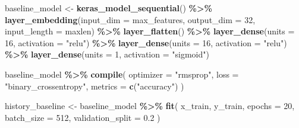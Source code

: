 \documentclass[
]{article}
\newenvironment{Shaded}{\begin{snugshade}}{\end{snugshade}}
\newcommand{\AttributeTok}[1]{\textcolor[rgb]{0.13,0.29,0.53}{#1}}
\newcommand{\DecValTok}[1]{\textcolor[rgb]{0.00,0.00,0.81}{#1}}
\newcommand{\FloatTok}[1]{\textcolor[rgb]{0.00,0.00,0.81}{#1}}
\newcommand{\FunctionTok}[1]{\textcolor[rgb]{0.13,0.29,0.53}{\textbf{#1}}}
\newcommand{\NormalTok}[1]{#1}
\newcommand{\OtherTok}[1]{\textcolor[rgb]{0.56,0.35,0.01}{#1}}
\newcommand{\SpecialCharTok}[1]{\textcolor[rgb]{0.81,0.36,0.00}{\textbf{#1}}}
\newcommand{\StringTok}[1]{\textcolor[rgb]{0.31,0.60,0.02}{#1}}
\begin{document}
\begin{Shaded}
\begin{Highlighting}[]
\NormalTok{baseline\_model }\OtherTok{\textless{}{-}} \FunctionTok{keras\_model\_sequential}\NormalTok{() }\SpecialCharTok{\%\textgreater{}\%}
  \FunctionTok{layer\_embedding}\NormalTok{(}\AttributeTok{input\_dim =}\NormalTok{ max\_features, }\AttributeTok{output\_dim =} \DecValTok{32}\NormalTok{, }\AttributeTok{input\_length =}\NormalTok{ maxlen) }\SpecialCharTok{\%\textgreater{}\%}
  \FunctionTok{layer\_flatten}\NormalTok{() }\SpecialCharTok{\%\textgreater{}\%}
  \FunctionTok{layer\_dense}\NormalTok{(}\AttributeTok{units =} \DecValTok{16}\NormalTok{, }\AttributeTok{activation =} \StringTok{"relu"}\NormalTok{) }\SpecialCharTok{\%\textgreater{}\%}
  \FunctionTok{layer\_dense}\NormalTok{(}\AttributeTok{units =} \DecValTok{16}\NormalTok{, }\AttributeTok{activation =} \StringTok{"relu"}\NormalTok{) }\SpecialCharTok{\%\textgreater{}\%}
  \FunctionTok{layer\_dense}\NormalTok{(}\AttributeTok{units =} \DecValTok{1}\NormalTok{, }\AttributeTok{activation =} \StringTok{"sigmoid"}\NormalTok{)}

\NormalTok{baseline\_model }\SpecialCharTok{\%\textgreater{}\%} \FunctionTok{compile}\NormalTok{(}
  \AttributeTok{optimizer =} \StringTok{"rmsprop"}\NormalTok{,}
  \AttributeTok{loss =} \StringTok{"binary\_crossentropy"}\NormalTok{,}
  \AttributeTok{metrics =} \FunctionTok{c}\NormalTok{(}\StringTok{"accuracy"}\NormalTok{)}
\NormalTok{)}

\NormalTok{history\_baseline }\OtherTok{\textless{}{-}}\NormalTok{ baseline\_model }\SpecialCharTok{\%\textgreater{}\%} \FunctionTok{fit}\NormalTok{(}
\NormalTok{  x\_train, y\_train,}
  \AttributeTok{epochs =} \DecValTok{20}\NormalTok{,}
  \AttributeTok{batch\_size =} \DecValTok{512}\NormalTok{,}
  \AttributeTok{validation\_split =} \FloatTok{0.2}
\NormalTok{)}
\end{Highlighting}
\end{Shaded}
\end{document}
